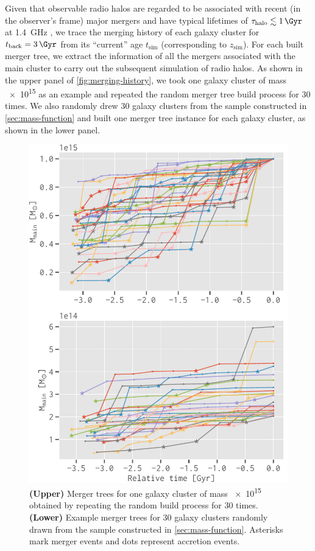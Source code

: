\documentclass[twocolumn]{aastex62}
\newcommand{\R}[1]{\mathrm{#1}}
\begin{document}
Given that observable radio halos are regarded to be associated
with recent (in the observer's frame) major mergers
and have typical lifetimes of $\tau_{\R{halo}} \lesssim \SI{1}{\Gyr}$
at \SI{1.4}{\GHz} \citep[e.g.,][]{brunetti2009,cassano2016},
we trace the merging history of each galaxy cluster for
$t_{\R{back}} = \SI{3}{\Gyr}$ from its \enquote{current}
age $t_{\R{sim}}$ (corresponding to $z_{\R{sim}}$).
For each built merger tree, we extract the information of all
the mergers associated with the main cluster to carry out the
subsequent simulation of radio halos.
As shown in the upper panel of \autoref{fig:merging-history},
we took one galaxy cluster of mass \SI{e15}{\solarmass} as an example and
repeated the random merger tree build process for 30 times.
We also randomly drew 30 galaxy clusters from the sample constructed
in \autoref{sec:mass-function} and built one merger tree instance for each
galaxy cluster, as shown in the lower panel.

\begin{figure}
  \centering
  \includegraphics[width=\columnwidth]{merging-history}
  \caption{\label{fig:merging-history}%
    \textbf{(Upper)} Merger trees for one galaxy cluster of mass
    \SI{e15}{\solarmass} obtained by repeating the random build process
    for 30 times.
    \textbf{(Lower)} Example merger trees for 30 galaxy clusters randomly
    drawn from the sample constructed in \autoref{sec:mass-function}.
    Asterisks mark merger events and dots represent accretion events.
  }
\end{figure}
\end{document}
